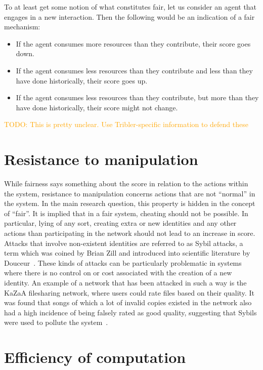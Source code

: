 \documentclass[a4paper,11pt]{book}
\newcommand\nicetohave[1]{\textcolor{orange}{TODO: #1}}
\theoremstyle{definition}
\begin{document}
To at least get some notion of what constitutes fair, let us consider an agent that
engages in a new interaction. Then the following would be an indication of a fair mechanism:

\begin{itemize}
    \item If the agent consumes more resources than they contribute, their score goes down.
    \item If the agent consumes less resources than they contribute and less than they have
        done historically, their score goes up.
     \item If the agent consumes less resources than they contribute, but more than they have
        done historically, their score might not change.
\end{itemize}

\nicetohave{This is pretty unclear. Use Tribler-specific information to defend these}

\section{Resistance to manipulation}

While fairness says something about the score in relation to the actions within
the system, resistance to manipulation concerns actions that are not ``normal''
in the system. In the main research question, this property is hidden in the concept of
``fair''. It is implied that in a fair system, cheating should not be possible.
In particular, lying of any sort, creating extra or new identities
and any other actions than participating in the network should not lead to an
increase in score. Attacks that involve non-existent identities are referred to
as Sybil attacks, a term which was coined by Brian Zill and introduced into
scientific literature by Douceur~\cite{douceur2002sybil}.
These kinds of attacks can be particularly problematic in systems where
there is no control on or cost associated with the creation of a new identity.
An example of a network that has been attacked in such a way is the KaZaA
filesharing network, where users could rate files based on their quality.
It was found that songs of which a lot of invalid copies existed in
the network also had a high incidence of being falsely rated as good
quality, suggesting that Sybils were used to pollute the system~\cite{liang2005pollution}.


\section{Efficiency of computation}
\end{document}
